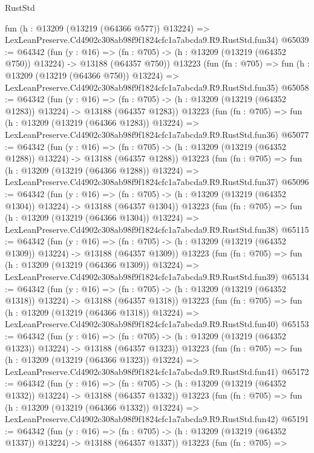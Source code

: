 \begin{lexlean}{RustStd}
\begin{coremodule}
    fun (h : @13209 (@13219 (@64366 @577)) @13224) =>
    LexLeanPreserve.Cd4902c308ab98f9f1824cfc1a7abcda9.R9.RustStd.fun34)
@65039 := @64342
    (fun (y : @16) =>
    (fn : @705) -> (h : @13209 (@13219 (@64352 @750)) @13224) -> @13188 (@64357 @750))
    @13223
    (fun (fn : @705) =>
    fun (h : @13209 (@13219 (@64366 @750)) @13224) =>
    LexLeanPreserve.Cd4902c308ab98f9f1824cfc1a7abcda9.R9.RustStd.fun35)
@65058 := @64342
    (fun (y : @16) =>
    (fn : @705) -> (h : @13209 (@13219 (@64352 @1283)) @13224) -> @13188 (@64357 @1283))
    @13223
    (fun (fn : @705) =>
    fun (h : @13209 (@13219 (@64366 @1283)) @13224) =>
    LexLeanPreserve.Cd4902c308ab98f9f1824cfc1a7abcda9.R9.RustStd.fun36)
@65077 := @64342
    (fun (y : @16) =>
    (fn : @705) -> (h : @13209 (@13219 (@64352 @1288)) @13224) -> @13188 (@64357 @1288))
    @13223
    (fun (fn : @705) =>
    fun (h : @13209 (@13219 (@64366 @1288)) @13224) =>
    LexLeanPreserve.Cd4902c308ab98f9f1824cfc1a7abcda9.R9.RustStd.fun37)
@65096 := @64342
    (fun (y : @16) =>
    (fn : @705) -> (h : @13209 (@13219 (@64352 @1304)) @13224) -> @13188 (@64357 @1304))
    @13223
    (fun (fn : @705) =>
    fun (h : @13209 (@13219 (@64366 @1304)) @13224) =>
    LexLeanPreserve.Cd4902c308ab98f9f1824cfc1a7abcda9.R9.RustStd.fun38)
@65115 := @64342
    (fun (y : @16) =>
    (fn : @705) -> (h : @13209 (@13219 (@64352 @1309)) @13224) -> @13188 (@64357 @1309))
    @13223
    (fun (fn : @705) =>
    fun (h : @13209 (@13219 (@64366 @1309)) @13224) =>
    LexLeanPreserve.Cd4902c308ab98f9f1824cfc1a7abcda9.R9.RustStd.fun39)
@65134 := @64342
    (fun (y : @16) =>
    (fn : @705) -> (h : @13209 (@13219 (@64352 @1318)) @13224) -> @13188 (@64357 @1318))
    @13223
    (fun (fn : @705) =>
    fun (h : @13209 (@13219 (@64366 @1318)) @13224) =>
    LexLeanPreserve.Cd4902c308ab98f9f1824cfc1a7abcda9.R9.RustStd.fun40)
@65153 := @64342
    (fun (y : @16) =>
    (fn : @705) -> (h : @13209 (@13219 (@64352 @1323)) @13224) -> @13188 (@64357 @1323))
    @13223
    (fun (fn : @705) =>
    fun (h : @13209 (@13219 (@64366 @1323)) @13224) =>
    LexLeanPreserve.Cd4902c308ab98f9f1824cfc1a7abcda9.R9.RustStd.fun41)
@65172 := @64342
    (fun (y : @16) =>
    (fn : @705) -> (h : @13209 (@13219 (@64352 @1332)) @13224) -> @13188 (@64357 @1332))
    @13223
    (fun (fn : @705) =>
    fun (h : @13209 (@13219 (@64366 @1332)) @13224) =>
    LexLeanPreserve.Cd4902c308ab98f9f1824cfc1a7abcda9.R9.RustStd.fun42)
@65191 := @64342
    (fun (y : @16) =>
    (fn : @705) -> (h : @13209 (@13219 (@64352 @1337)) @13224) -> @13188 (@64357 @1337))
    @13223
    (fun (fn : @705) =>

\end{coremodule}
\end{lexlean}

